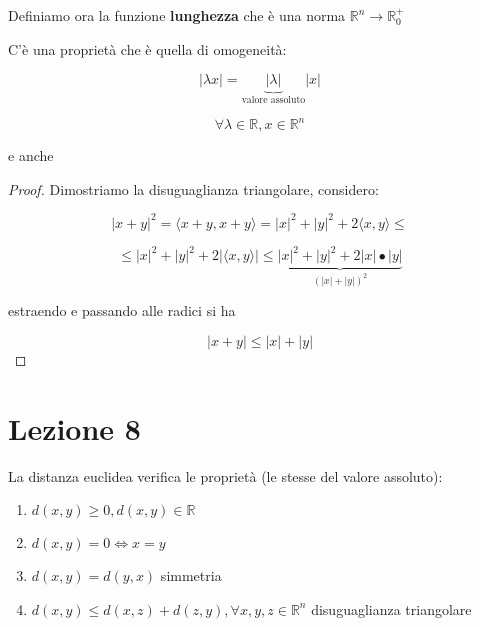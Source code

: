 \documentclass[11pt]{article}
\begin{document}
 Definiamo ora la funzione \textbf{lunghezza} che è una norma $\mathbb{R}^{n}\rightarrow \mathbb{R}_0^{+}$

 C'è una proprietà che è quella di omogeneità:

 \[
     |\lambda x| = \underbrace{|\lambda|}_\text{valore assoluto} |x| 
 \]

 \[
 \forall \lambda \in \mathbb{R},x \in \mathbb{R}^{n}    
 \]

 e anche 


 

\begin{proof}
       Dimostriamo la disuguaglianza triangolare, considero:

       \[
           |x+y|^{2} = \langle x+y , x+y \rangle = |x|^{2}+|y|^{2} + 2 \langle x,y \rangle \le 
       \]

       \[
           \le |x|^{2} + |y| ^{2} + 2|\langle x,y \rangle| \le \underbrace{|x| ^{2} + |y|^{2} + 2|x|\bullet |y|}_{(|x|+|y|)^{2}}
       \]

       estraendo e passando alle radici si ha

       \[
           |x+y| \le |x|+|y|
       \]
\end{proof}




\newpage

\section{Lezione 8}

La distanza euclidea verifica le proprietà (le stesse del valore assoluto):

\begin{enumerate}
    \item  $d(x,y) \ge 0, d(x,y) \in \mathbb{R}$
    \item  $d(x,y) = 0 \Leftrightarrow x=y$
    \item  $d(x,y) = d(y,x)$ simmetria
    \item  $d(x,y) \le d(x,z) + d(z,y), \forall x,y,z \in \mathbb{R}^{n} $ disuguaglianza triangolare
\end{enumerate}
\end{document}

